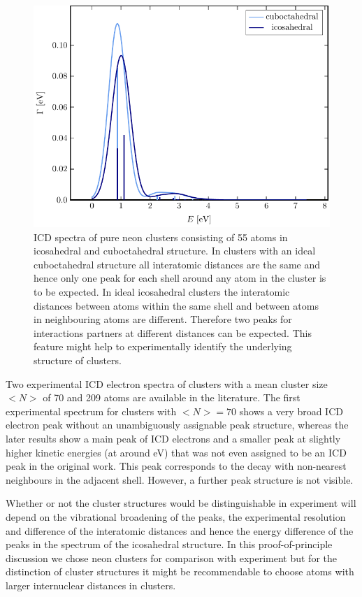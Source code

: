 \begin{figure}[h]
 \centering
 \includegraphics[width=\columnwidth]{reinNe.pdf}
 \caption{ICD spectra of pure neon clusters consisting of 55 atoms in
          icosahedral and cuboctahedral structure. In clusters with an
          ideal cuboctahedral structure
          all interatomic distances are the same and hence only one peak
          for each shell around any atom in the cluster is to be expected.
          In ideal icosahedral clusters the interatomic distances between atoms
          within the same shell and between atoms in neighbouring atoms
          are different. Therefore two peaks for interactions partners
          at different distances can be expected. This feature might
          help to experimentally identify the underlying structure of clusters.}
 \label{figure:reinNe}
\end{figure}

Two experimental ICD electron spectra of clusters
with a mean cluster size $<N>$ of 70 and 209 atoms
are available in the literature.
\cite{Marburger03,Barth06_2} 
The first experimental spectrum for clusters with $<N>=70$ shows a very
broad ICD electron peak without an unambiguously assignable peak structure,
whereas the later results show a main peak of ICD electrons and a smaller peak
at slightly higher kinetic energies (at around \unit[3]{eV})
that was not even assigned to be an ICD peak in the original work. This peak
corresponds to the decay with non-nearest neighbours in the adjacent shell.
However, a further peak
structure is not visible.

Whether or not the cluster structures would be distinguishable in experiment
will depend on the vibrational broadening of the peaks, the experimental
resolution and difference of the interatomic distances
and hence the energy difference of the peaks in the spectrum of the
icosahedral structure. In this proof-of-principle discussion
we chose neon clusters for comparison with experiment but for the distinction
of cluster structures it might be recommendable to choose atoms with larger
internuclear distances in clusters.

